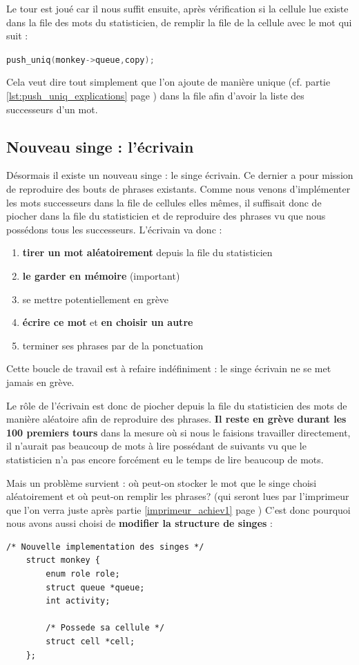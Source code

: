\documentclass{article}
\newcommand{\inlinecode}[2]{\colorbox{white}{\lstinline[language=#1]$#2$}}
\begin{document}
Le tour est joué car il nous suffit ensuite, après vérification si la cellule lue existe dans la file des mots du statisticien, de remplir la file de la cellule avec le mot qui suit :

\inlinecode{C}{push_uniq(monkey->queue,copy);}

Cela veut dire tout simplement que l'on ajoute de manière unique (cf. partie \ref{lst:push_uniq_explications} page \pageref{lst:push_uniq_explications}) dans la file afin d'avoir la liste des successeurs d'un mot.


\subsection{Nouveau singe : l'écrivain}
\label{subsct:ecrivain}

Désormais il existe un nouveau singe : le singe écrivain. Ce dernier a pour mission de reproduire des bouts de phrases existants. Comme nous venons d'implémenter les mots successeurs dans la file de cellules elles mêmes, il suffisait donc de piocher dans la file du statisticien et de reproduire des phrases vu que nous possédons tous les successeurs. L'écrivain va donc :
\begin{enumerate}
    \item \textbf{tirer un mot aléatoirement} depuis la file du statisticien
    \item \textbf{le garder en mémoire} (important)
    \item se mettre potentiellement en grève
    \item \textbf{écrire ce mot} et \textbf{en choisir un autre}
    \item terminer ses phrases par de la ponctuation
\end{enumerate}

Cette boucle de travail est à refaire indéfiniment : le singe écrivain ne se met jamais en grève.

Le rôle de l'écrivain est donc de piocher depuis la file du statisticien des mots de manière aléatoire afin de reproduire des phrases. \textbf{Il reste en grève durant les 100 premiers tours} dans la mesure où si nous le faisions travailler directement, il n'aurait pas beaucoup de mots à lire possédant de suivants vu que le statisticien n'a pas encore forcément eu le temps de lire beaucoup de mots.

Mais un problème survient : où peut-on stocker le mot que le singe choisi aléatoirement et où peut-on remplir les phrases? (qui seront lues par l'imprimeur que l'on verra juste après partie \ref{imprimeur_achiev1} page \pageref{imprimeur_achiev1}) C'est donc pourquoi nous avons aussi choisi de \textbf{modifier la structure de singes} :
\begin{lstlisting}
/* Nouvelle implementation des singes */
    struct monkey {
        enum role role;
        struct queue *queue;
        int activity;
        
        /* Possede sa cellule */
        struct cell *cell;
    }; 
\end{lstlisting}
\label{lst:nouvelle_impl_singe}
\end{document}
